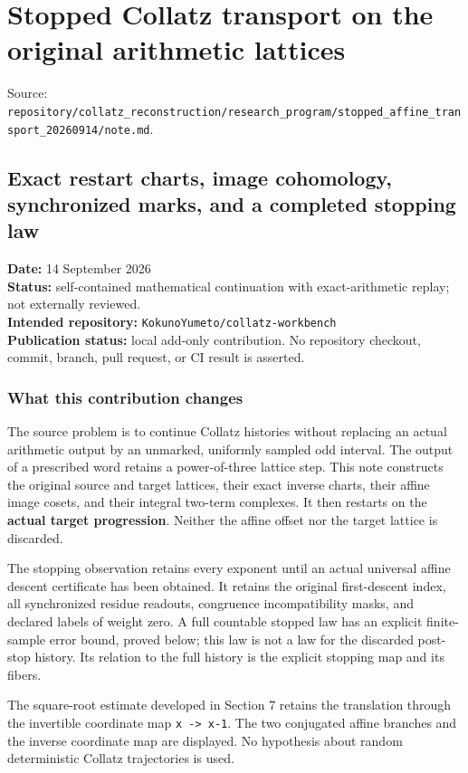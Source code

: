 \chapter{Stopped Collatz transport on the original arithmetic lattices}
{\small\sffamily Source: \nolinkurl{repository/collatz_reconstruction/research_program/stopped_affine_transport_20260914/note.md}.\par}


\section{Exact restart charts, image cohomology, synchronized marks, and
a completed stopping law}

\textbf{Date:} 14 September 2026\\
\textbf{Status:} self-contained mathematical continuation with
exact-arithmetic replay; not externally reviewed.\\
\textbf{Intended repository:}
\nolinkurl{KokunoYumeto/collatz-workbench}\\
\textbf{Publication status:} local add-only contribution. No repository
checkout, commit, branch, pull request, or CI result is asserted.

\subsection{What this contribution changes}

The source problem is to continue Collatz histories without replacing an
actual arithmetic output by an unmarked, uniformly sampled odd interval.
The output of a prescribed word retains a power-of-three lattice step.
This note constructs the original source and target lattices, their
exact inverse charts, their affine image cosets, and their integral
two-term complexes. It then restarts on the \textbf{actual target
progression}. Neither the affine offset nor the target lattice is
discarded.

The stopping observation retains every exponent until an actual
universal affine descent certificate has been obtained. It retains the
original first-descent index, all synchronized residue readouts,
congruence incompatibility masks, and declared labels of weight zero. A
full countable stopped law has an explicit finite-sample error bound,
proved below; this law is not a law for the discarded post-stop history.
Its relation to the full history is the explicit stopping map and its
fibers.

The square-root estimate developed in Section 7 retains the translation
through the invertible coordinate map \nolinkurl{x -> x-1}. The two
conjugated affine branches and the inverse coordinate map are displayed.
No hypothesis about random deterministic Collatz trajectories is used.


